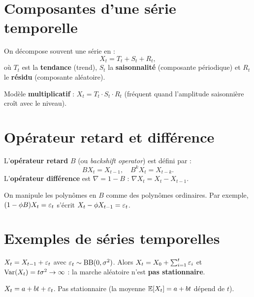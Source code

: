 \section{Composantes d'une s\'erie temporelle}

\begin{definition}
On d\'ecompose souvent une s\'erie en :
\[
X_t = T_t + S_t + R_t,
\]
o\`u $T_t$ est la \textbf{tendance} (trend), $S_t$ la \textbf{saisonnalit\'e} (composante p\'eriodique) et $R_t$ le \textbf{r\'esidu} (composante al\'eatoire).

Mod\`ele \textbf{multiplicatif} : $X_t = T_t\cdot S_t\cdot R_t$ (fr\'equent quand l'amplitude saisonni\`ere cro\^it avec le niveau).
\end{definition}

\section{Op\'erateur retard et diff\'erence}

\begin{definition}
L'\textbf{op\'erateur retard} $B$ (ou \emph{backshift operator}) est d\'efini par :
\[
BX_t = X_{t-1}, \quad B^k X_t = X_{t-k}.
\]
L'\textbf{op\'erateur diff\'erence} est $\nabla = 1-B$ : $\nabla X_t = X_t - X_{t-1}$.
\end{definition}

\begin{remarque}
On manipule les polyn\^omes en $B$ comme des polyn\^omes ordinaires. Par exemple, $(1-\phi B)X_t = \varepsilon_t$ s'\'ecrit $X_t - \phi X_{t-1} = \varepsilon_t$.
\end{remarque}

\section{Exemples de s\'eries temporelles}

\begin{exemple}
$X_t = X_{t-1} + \varepsilon_t$ avec $\varepsilon_t\sim\mathrm{BB}(0,\sigma^2)$. Alors $X_t = X_0 + \sum_{i=1}^t \varepsilon_i$ et $\operatorname{Var}(X_t) = t\sigma^2 \to \infty$ : la marche al\'eatoire n'est \textbf{pas stationnaire}.
\end{exemple}

\begin{exemple}
$X_t = a + bt + \varepsilon_t$. Pas stationnaire (la moyenne $\mathbb{E}[X_t] = a+bt$ d\'epend de $t$).
\end{exemple}

